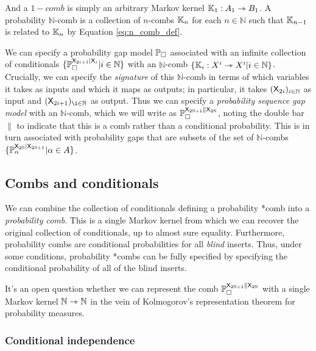 And a $1-comb$ is simply an arbitrary Markov kernel $\mathbb{K}_1:A_1\rightarrowtriangle B_1$. A probability $\mathbb{N}$-comb is a collection of $n$-combs $\mathbb{K}_n$ for each $n\in \mathbb{N}$ such that $\mathbb{K}_{n-1}$ is related to $\mathbb{K}_n$ by Equation \ref{eq:n_comb_def}.

We can specify a probability gap model $\mathbb{P}_\square$ associated with an infinite collection of conditionals $\{\mathbb{P}_\square^{\mathsf{X}_{2i+1}|\mathsf{X}_{i}}|i\in\mathbb{N}\}$ with an $\mathbb{N}$-comb $\{\mathbb{K}_{i}:X^i\rightarrowtriangle X^i|i\in\mathbb{N}\}$. Crucially, we can specify the \emph{signature} of this $\mathbb{N}$-comb in terms of which variables it takes as inputs and which it maps as outputs; in particular, it takes $(\mathsf{X}_{2i})_{i\in \mathbb{N}}$ as input and $(\RV{X}_{2i+1})_{\i\in\mathbb{N}}$ as output. Thus we can specify a \emph{probability sequence gap model} with an $\mathbb{N}$-comb, which we will write as $\mathbb{P}_\square^{\mathsf{X}_{2\mathbb{N}+1}\|\mathsf{X}_{2\mathbb{N}}}$, noting the double bar $\|$ to indicate that this is a comb rather than a conditional probability. This is in turn associated with probability gaps that are subsets of the set of $\mathbb{N}$-combs $\{\mathbb{P}_\alpha^{\mathsf{X}_{2\mathbb{N}}|\mathsf{X}_{2\mathbb{N}+1}}|\alpha\in A\}$.

\subsection{Combs and conditionals}

We can combine the collection of conditionals defining a probability *comb into a \emph{probability comb}. This is a single Markov kernel from which we can recover the original collection of conditionals, up to almost sure equality. Furthermore, probability combs are conditional probabilities for all \emph{blind} inserts. Thus, under some conditions, probability *combs can be fully specified by specifying the conditional probability of all of the blind inserts.

It's an open question whether we can represent the comb $\mathbb{P}_\square^{\mathsf{X}_{2\mathbb{N}+1}\|\mathsf{X}_{2\mathbb{N}}}$ with a single Markov kernel $\mathbb{N}\rightarrowtriangle \mathbb{N}$ in the vein of Kolmogorov's representation theorem for probability measures.

\subsubsection{Conditional independence}\label{ssec:cond_indep}

